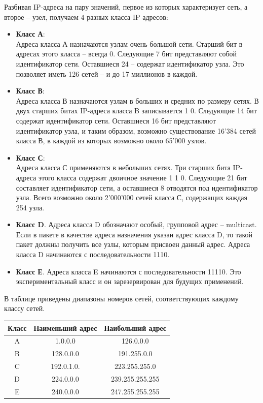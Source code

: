 \documentclass[a4paper]{article}
\begin{document}
		Разбивая IP-адреса на пару значений, первое из которых характеризует сеть, а второе -- узел, получаем 4 разных класса IP адресов:
		\begin{itemize}

			\item
				\textbf{Класс А}:\\
				Адреса класса А назначаются узлам очень большой сети. Старший бит в адресах этого класса -- всегда 0. Следующие 7 бит представляют собой идентификатор сети. Оставшиеся 24 -- содержат идентификатор узла. Это позволяет иметь 126 сетей -- и до 17 миллионов в каждой.
			\item
				\textbf{Класс В}:\\
				Адреса класса В назначаются узлам в больших и средних по размеру сетях. В двух старших битах IP-адреса класса B записывается 1 0. Следующие 14 бит содержат идентификатор сети. Оставшиеся 16 бит представляют идентификатор узла, и таким образом, возможно существование 16'384 сетей класса В, в каждой из которых возможно около 65'000 узлов.
			\item
				\textbf{Класс С}:\\
				Адреса класса С применяются в небольших сетях. Три старших бита IP-адреса этого класса содержат двоичное значение 1 1 0. Следующие 21 бит составляет идентификатор сети, а оставшиеся 8 отводятся под идентификатор узла. Всего возможно около 2'000'000 сетей класса С, содержащих каждая 254 узла.
			\item
				\textbf{Класс D}. Адреса класса D обозначают особый, групповой адрес -- multicast. Если в пакете в качестве адреса назначения указан адрес класса D, то такой пакет должны получить все узлы, которым присвоен данный адрес. Адреса класса D начинаются с последовательности 1110.

			\item
				\textbf{Класс Е}. Адреса класса E начинаются с последовательности 11110. Это экспериментальный класс и он зарезервирован для будущих применений.

		\end{itemize}

В таблице приведены диапазоны номеров сетей, соответствующих каждому классу сетей.

		\begin{center}
			\begin{tabular}{|c|c|c|}
			\hline
			Класс&Наименьший адрес&Наибольший адрес\\
			\hline
			A&1.0.0.0&126.0.0.0\\
			B&128.0.0.0&191.255.0.0\\
			C&192.0.1.0.&223.255.255.0\\
			D&224.0.0.0&239.255.255.255\\
			E&240.0.0.0&247.255.255.255\\
			\hline
		\end{tabular}
	\end{center}
\end{document}
